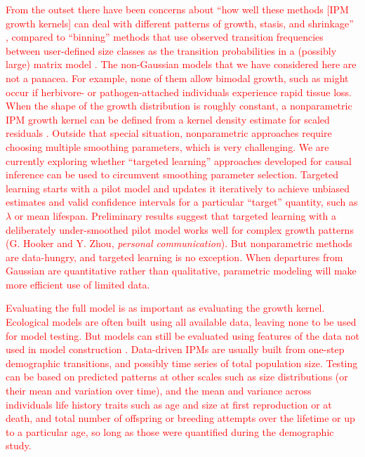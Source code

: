 \documentclass[12pt]{article}
\newcommand{\new}{\textcolor{red}}
\begin{document}
\new{From the outset there have been concerns about ``how well these methods [IPM growth kernels] can deal with different patterns of growth, stasis, and shrinkage'' \citep[][p. 200]{morris-doak-2002}, compared to ``binning'' methods that use observed transition frequencies between 
user-defined size classes as the transition probabilities in a (possibly large) matrix model \citep{doak-critical-2021}. 
The non-Gaussian models that we have considered here are not a panacea. 
For example, none of them allow bimodal growth, such as might occur if herbivore- or pathogen-attached individuals experience rapid tissue loss. 
When the shape of the growth distribution is roughly constant, a nonparametric IPM growth kernel can be defined from a kernel density estimate for scaled residuals \citep[][p. 288]{ellner-etal-2016}. 
Outside that special situation, nonparametric approaches require choosing multiple smoothing parameters, which is very challenging. 
We are currently exploring whether ``targeted learning'' approaches developed for causal inference \citep{vande-rose-2011} can be used to circumvent smoothing parameter selection. Targeted learning starts with a pilot model and updates it iteratively to achieve unbiased estimates and valid confidence intervals for a particular ``target'' quantity, such as $\lambda$ or mean lifespan. Preliminary results suggest that targeted learning with a deliberately under-smoothed pilot model works well for complex growth patterns (G. Hooker and Y. Zhou, \emph{personal communication}). But nonparametric methods are data-hungry, and targeted learning is no exception. When departures from Gaussian are quantitative rather than qualitative, parametric modeling will make more efficient use of limited data.}

\new{Evaluating the full model is as important as evaluating the growth kernel. 
Ecological models are often built using all available data, leaving none to be used for model testing. 
But models can still be evaluated using features of the data not used in model construction \citep{getz-etal-2018}. 
Data-driven IPMs are usually built from one-step demographic transitions, and possibly time series of total population size. 
Testing can be based on predicted patterns at other scales such as size distributions (or their mean and variation over time), and the mean and variance across individuals life history traits such as 
age and size at first reproduction or at death, and total number of offspring or breeding attempts over the lifetime or up to a particular age, so long as those were quantified during the demographic study.} 
\end{document}
